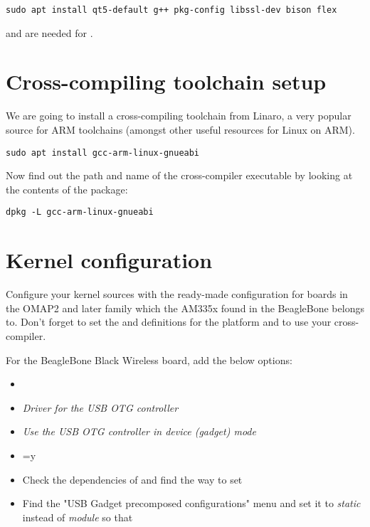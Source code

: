\begin{verbatim}
sudo apt install qt5-default g++ pkg-config libssl-dev bison flex
\end{verbatim}

 and  are needed for .

\section{Cross-compiling toolchain setup}

We are going to install a cross-compiling toolchain from Linaro, a
very popular source for ARM toolchains (amongst other useful resources
for Linux on ARM).

\begin{verbatim}
sudo apt install gcc-arm-linux-gnueabi
\end{verbatim}

Now find out the path and name of the cross-compiler executable by looking at the contents of the package:

\begin{verbatim}
dpkg -L gcc-arm-linux-gnueabi
\end{verbatim}

\section{Kernel configuration}

Configure your kernel sources with the ready-made configuration for boards in
the OMAP2 and later family which the AM335x found in the BeagleBone
belongs to. Don't forget to set the  and
 definitions for the  platform and to
use your cross-compiler.

For the BeagleBone Black Wireless board, add the below options:
\begin{itemize}
  \item {}
  \item {} {\em Driver for the USB OTG
        controller}
  \item {} {\em Use the USB OTG controller
	in device (gadget) mode} 
  \item {}=y
  \item Check the dependencies of 
        and find the way to set 
  \item Find the "USB Gadget precomposed configurations" menu
        and set it to {\em static} instead of {\em module}
	so that 
\end{itemize}

